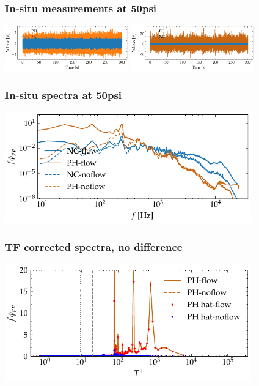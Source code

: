 \documentclass[aspectratio=169,9pt]{beamer}
\begin{document}
\begin{frame}
    \frametitle{In-situ measurements at 50psi}
        \centering
        \includegraphics[width=0.4\textwidth]{sanity/50psi/PH-NKD/calib_ts_signals_50psi_nf.pdf}
        \includegraphics[width=0.4\textwidth]{sanity/50psi/PH-NKD/calib_ts_signals_50psi_f.pdf}
\end{frame}

\begin{frame}
    \frametitle{In-situ spectra at 50psi}
        \centering
        \includegraphics[width=0.8\textwidth]{sanity/50psi/PH-NKD/calib_spectra_50psi_f.pdf}
\end{frame}

\begin{frame}
    \frametitle{TF corrected spectra, no difference}
        \centering
        \includegraphics[width=0.8\textwidth]{sanity/50psi/PH-NKD/calib_spectra_50psi_flow_recon.pdf}
\end{frame}
\end{document}
